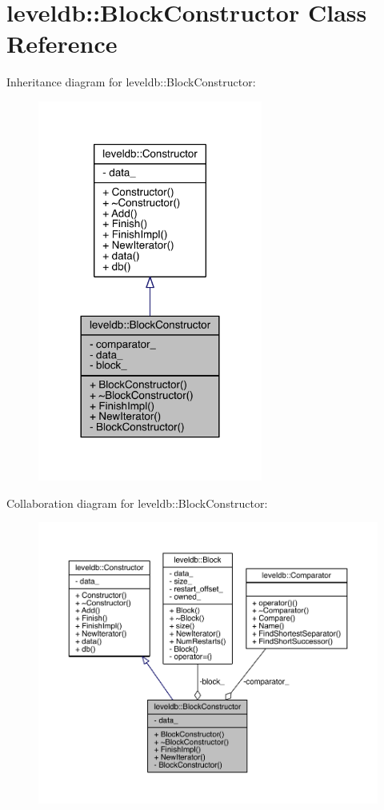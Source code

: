 \hypertarget{classleveldb_1_1_block_constructor}{}\section{leveldb\+:\+:Block\+Constructor Class Reference}
\label{classleveldb_1_1_block_constructor}


Inheritance diagram for leveldb\+:\+:Block\+Constructor\+:\nopagebreak
\begin{figure}[H]
\begin{center}
\leavevmode
\includegraphics[width=209pt]{classleveldb_1_1_block_constructor__inherit__graph}
\end{center}
\end{figure}


Collaboration diagram for leveldb\+:\+:Block\+Constructor\+:\nopagebreak
\begin{figure}[H]
\begin{center}
\leavevmode
\includegraphics[width=350pt]{classleveldb_1_1_block_constructor__coll__graph}
\end{center}
\end{figure}
